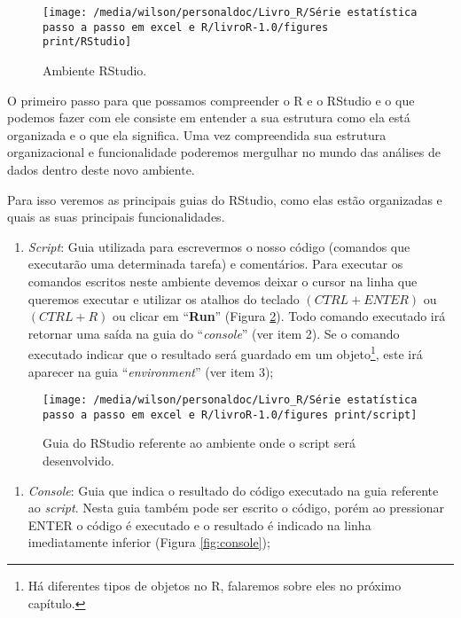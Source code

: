 \documentclass[14pt,titlepage, oneside, openany, a4paper]{book}
\providecommand{\tightlist}{%
  \setlength{\itemsep}{0pt}\setlength{\parskip}{0pt}}
\begin{document}
\begin{figure}[H]
\texttt{[image: /media/wilson/personaldoc/Livro\_R/Série estatística passo a passo em excel e R/livroR-1.0/figures print/RStudio]} \caption{Ambiente RStudio.}\label{fig:RStudio}
\end{figure}

O primeiro passo para que possamos compreender o R e o RStudio e o que podemos fazer com ele consiste em entender a sua estrutura como ela está organizada e o que ela significa. Uma vez compreendida sua estrutura organizacional e funcionalidade poderemos mergulhar no mundo das análises de dados dentro deste novo ambiente.

Para isso veremos as principais guias do RStudio, como elas estão organizadas e quais as suas principais funcionalidades.

\begin{enumerate}
\def\labelenumi{\arabic{enumi}.}
\tightlist
\item
  \emph{Script}: Guia utilizada para escrevermos o nosso código (comandos que executarão uma determinada tarefa) e comentários. Para executar os comandos escritos neste ambiente devemos deixar o cursor na linha que queremos executar e utilizar os atalhos do teclado \((CTRL + ENTER)\) ou \((CTRL + R)\) ou clicar em ``\textbf{Run}'' (Figura \ref{fig:script}). Todo comando executado irá retornar uma saída na guia do ``\emph{console}'' (ver item 2). Se o comando executado indicar que o resultado será guardado em um objeto\footnote{Há diferentes tipos de objetos no R, falaremos sobre eles no próximo capítulo.}, este irá aparecer na guia ``\emph{environment}'' (ver item 3);
\end{enumerate}

\begin{figure}[H]
\texttt{[image: /media/wilson/personaldoc/Livro\_R/Série estatística passo a passo em excel e R/livroR-1.0/figures print/script]} \caption{Guia do RStudio referente ao ambiente onde o script será desenvolvido.}\label{fig:script}
\end{figure}

\begin{enumerate}
\def\labelenumi{\arabic{enumi}.}
\setcounter{enumi}{1}
\tightlist
\item
  \emph{Console}: Guia que indica o resultado do código executado na guia referente ao \emph{script}. Nesta guia também pode ser escrito o código, porém ao pressionar ENTER o código é executado e o resultado é indicado na linha imediatamente inferior (Figura \ref{fig:console});
\end{enumerate}
\end{document}
